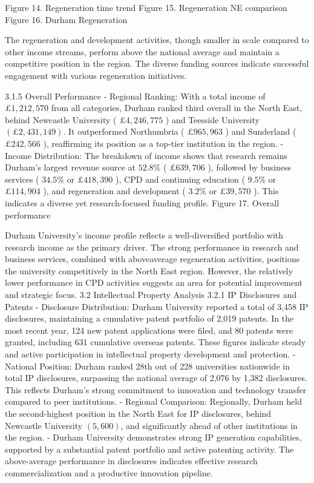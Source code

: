 Figure 14. Regeneration time trend 
Figure 15. Regeneration NE comparison
Figure 16. Durham Regeneration

The regeneration and development activities, though smaller in scale compared to other income streams, perform above the national average and maintain a competitive position in the region. The diverse funding sources indicate successful engagement with various regeneration initiatives.

3.1.5 Overall Performance
- Regional Ranking: With a total income of $£ 1,212,570$ from all categories, Durham ranked third overall in the North East, behind Newcastle University ( $£ 4,246,775$ ) and Teesside University $(£ 2,431,149)$. It outperformed Northumbria ( $£ 965,963$ ) and Sunderland ( $£ 242,566$ ), reaffirming its position as a top-tier institution in the region.
- Income Distribution: The breakdown of income shows that research remains Durham's largest revenue source at $52.8 \%$ ( $£ 639,706$ ), followed by business services ( $34.5 \%$ or $£ 418,390$ ), CPD and continuing education ( $9.5 \%$ or $£ 114,904$ ), and regeneration and development ( $3.2 \%$ or $£ 39,570$ ). This indicates a diverse yet research-focused funding profile.
Figure 17. Overall performance

Durham University's income profile reflects a well-diversified portfolio with research income as the primary driver. The strong performance in research and business services, combined with aboveaverage regeneration activities, positions the university competitively in the North East region. However, the relatively lower performance in CPD activities suggests an area for potential improvement and strategic focus.
3.2 Intellectual Property Analysis
3.2.1 IP Disclosures and Patents
- Disclosure Distribution: Durham University reported a total of 3,458 IP disclosures, maintaining a cumulative patent portfolio of 2,019 patents. In the most recent year, 124 new patent applications were filed, and 80 patents were granted, including 631 cumulative overseas patents. These figures indicate steady and active participation in intellectual property development and protection.
- National Position: Durham ranked 28th out of 228 universities nationwide in total IP disclosures, surpassing the national average of 2,076 by 1,382 disclosures. This reflects Durham's strong commitment to innovation and technology transfer compared to peer institutions.
- Regional Comparison: Regionally, Durham held the second-highest position in the North East for IP disclosures, behind Newcastle University $(5,600)$, and significantly ahead of other institutions in the region.
- Durham University demonstrates strong IP generation capabilities, supported by a substantial patent portfolio and active patenting activity. The above-average performance in disclosures indicates effective research commercialization and a productive innovation pipeline.

